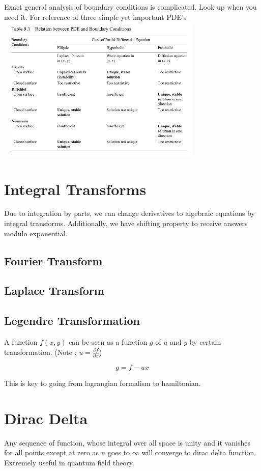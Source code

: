 \documentclass{report}
\begin{document}
\noindent Exact general analysis of boundary conditions is complicated. Look up when you need it. For reference of three simple yet important PDE's\\

\includegraphics[width=10cm, height=7cm]{./Images/boundary.png}

\section{Integral Transforms}
Due to integration by parts, we can change derivatives to algebraic equations by integral transforms. Additionally, we have shifting property to receive answers modulo exponential.

\subsection{Fourier Transform}

\subsection{Laplace Transform}

\subsection{Legendre Transformation}
A function $f(x,y)$ can be seen as a function $g$ of $u$ and $y$ by certain transformation. (Note : $u=\frac{\partial f}{\partial x}$)

$$g = f - ux$$

\noindent This is key to going from lagrangian formalism to hamiltonian.

\section{Dirac Delta}
Any sequence of function, whose integral over all space is unity and it vanishes for all points except at zero as $n$ goes to $\infty$ will converge to dirac delta function. Extremely useful in quantum field theory.
\end{document}

